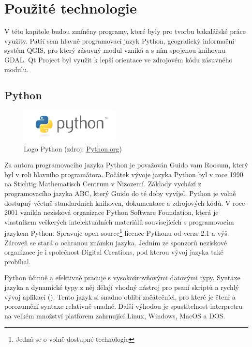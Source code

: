 \chapter{Použité technologie}
\label{3-technologie}
V této kapitole budou zmíněny programy, které byly pro tvorbu
bakalářské práce využity. Patří sem hlavně programovací jazyk Python,
geografický informační systém QGIS, pro který zásuvný modul vzniká a s
ním spojenou knihovnu GDAL. Qt Project byl využit k lepší orientace ve
zdrojovém kódu zásuvného modulu.

\section{Python}
\label{sec:python}
\begin{figure}[H]
	 \centering
      \includegraphics[width=5cm]{./pictures/python-logo.png}
      \caption{Logo Python (zdroj:
\href{https://www.python.org/static/community_logos/python-logo-master-v3-TM.png}{Python.org})}
      \label{fig:python}
  \end{figure}
  
Za autora programovacího jazyka Python je považován Guido vam Roosum,
který byl v roli hlavního programátora. Počátek vývoje jazyka Python
byl v roce 1990 na Stichtig Mathematisch Centrum v Nizozemí. Základy
vychází z programovacího jazyka ABC, který Guido do té doby
vyvíjel. Python je volně dostupný včetně standardních knihoven,
dokumentace a zdrojových kódů. V roce 2001 vznikla nezisková
organizace Python Software Foundation, která je vlastníkem veškerých
intelektuálních materiálů souvisejících s programovacím jazykem
Python. Spravuje open source\footnote{Jedná se o volně dostupné
  technologie} licence Pythonu od verze 2.1 a výš. Zároveň se stará o
ochranou známku jazyka. Jedním ze sponzorů neziskové organizace je i
společnost Digital Creations, pod kterou vývoj jazyka také probíhal.

Python účinně a efektivně pracuje s vysokoúrovňovými datovými
typy. Syntaxe jazyka a dynamické typy z něj dělají vhodný nástroj pro
psaní skriptů a rychlý vývoj aplikací (). Tento jazyk si
snadno oblíbí začátečníci, pro které je čtení a porozumění syntaxe
relativně snadné. Další výhodou je spustitelnost interpretru na velkém
množství platforem zahrnující Linux, Windows, MacOS a
DOS. \cite{ucebnicepython, python}

